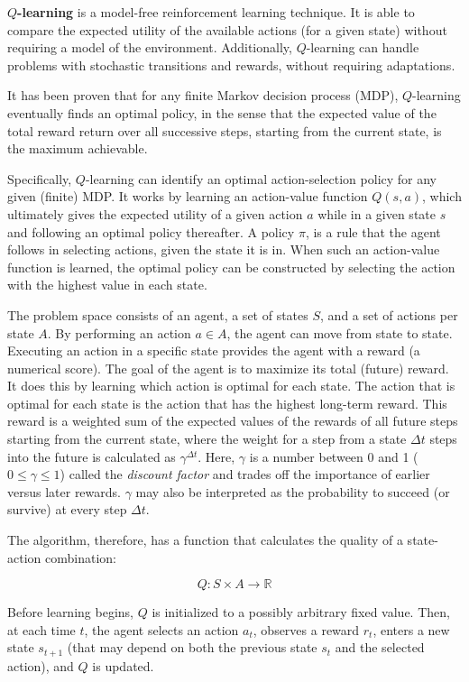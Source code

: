 \documentclass{article}
\begin{document}
{\bf $Q$-learning} is a model-free reinforcement learning technique. 
It is able to compare the expected utility of the available actions 
(for a given state) without requiring a model of the environment. 
Additionally, $Q$-learning can handle problems with stochastic 
transitions and rewards, without requiring adaptations.

It has been proven that for any finite Markov decision process (MDP), 
$Q$-learning eventually finds an optimal policy, in the sense that the 
expected value of the total reward return over all successive steps, 
starting from the current state, is the maximum achievable.

Specifically, $Q$-learning can identify an optimal 
action-selection policy for any given (finite) MDP.
It works by learning an action-value function $Q(s, a)$, which 
ultimately gives the expected utility of a given action $a$ 
while in a given state $s$ and following an optimal policy thereafter. 
A policy $\pi$, is a rule that the agent follows in selecting actions, 
given the state it is in. When such an action-value function is learned, 
the optimal policy can be constructed by selecting 
the action with the highest value in each state.

The problem space consists of an agent, a set of states $S$, 
and a set of actions per state $A$. By performing an action $a \in A$, 
the agent can move from state to state. Executing an action in a 
specific state provides the agent with a reward (a numerical score). 
The goal of the agent is to maximize its total (future) reward. 
It does this by learning which action is optimal for each state. 
The action that is optimal for each state is the action that has 
the highest long-term reward. This reward is a weighted sum of 
the expected values of the rewards of all future steps starting from 
the current state, where the weight for a step from a state $\Delta t$ 
steps into the future is calculated as $\gamma^{\Delta t}$. 
Here, $\gamma$ is a number between 0 and 1 ($0 \le \gamma \le 1$) called 
the {\it{discount factor}} and trades off the importance of earlier 
versus later rewards. $\gamma$ may also be interpreted as the 
probability to succeed (or survive) at every step $\Delta t$.

The algorithm, therefore, has a function that calculates 
the quality of a state-action combination:

$$Q: S \times A \to \mathbb{R}$$

Before learning begins, $Q$ is initialized to a possibly arbitrary fixed value. 
Then, at each time $t$, the agent selects an action $a_t$, observes a reward $r_t$, 
enters a new state $s_{t+1}$ (that may depend on both the previous state $s_t$ 
and the selected action), and $Q$ is updated. 
\end{document}
